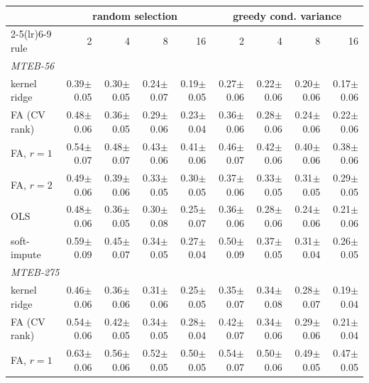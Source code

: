 \begin{tabular}{lrrrrrrrr}
\toprule
 & \multicolumn{4}{c}{random selection} & \multicolumn{4}{c}{greedy cond. variance} \\
\cmidrule(lr){2-5}\cmidrule(lr){6-9}
rule & 2 & 4 & 8 & 16 & 2 & 4 & 8 & 16 \\
\midrule
\multicolumn{9}{l}{\emph{MTEB-56}} \\
kernel ridge & 0.39{\tiny$\pm$0.05} & 0.30{\tiny$\pm$0.05} & 0.24{\tiny$\pm$0.07} & 0.19{\tiny$\pm$0.05} & 0.27{\tiny$\pm$0.06} & 0.22{\tiny$\pm$0.06} & 0.20{\tiny$\pm$0.06} & 0.17{\tiny$\pm$0.06} \\
FA (CV rank) & 0.48{\tiny$\pm$0.06} & 0.36{\tiny$\pm$0.05} & 0.29{\tiny$\pm$0.06} & 0.23{\tiny$\pm$0.04} & 0.36{\tiny$\pm$0.06} & 0.28{\tiny$\pm$0.06} & 0.24{\tiny$\pm$0.06} & 0.22{\tiny$\pm$0.06} \\
FA, $r=1$ & 0.54{\tiny$\pm$0.07} & 0.48{\tiny$\pm$0.07} & 0.43{\tiny$\pm$0.06} & 0.41{\tiny$\pm$0.06} & 0.46{\tiny$\pm$0.07} & 0.42{\tiny$\pm$0.06} & 0.40{\tiny$\pm$0.06} & 0.38{\tiny$\pm$0.06} \\
FA, $r=2$ & 0.49{\tiny$\pm$0.06} & 0.39{\tiny$\pm$0.06} & 0.33{\tiny$\pm$0.05} & 0.30{\tiny$\pm$0.05} & 0.37{\tiny$\pm$0.06} & 0.33{\tiny$\pm$0.05} & 0.31{\tiny$\pm$0.05} & 0.29{\tiny$\pm$0.05} \\
OLS & 0.48{\tiny$\pm$0.06} & 0.36{\tiny$\pm$0.05} & 0.30{\tiny$\pm$0.08} & 0.25{\tiny$\pm$0.07} & 0.36{\tiny$\pm$0.06} & 0.28{\tiny$\pm$0.06} & 0.24{\tiny$\pm$0.06} & 0.21{\tiny$\pm$0.06} \\
soft-impute & 0.59{\tiny$\pm$0.09} & 0.45{\tiny$\pm$0.07} & 0.34{\tiny$\pm$0.05} & 0.27{\tiny$\pm$0.04} & 0.50{\tiny$\pm$0.09} & 0.37{\tiny$\pm$0.05} & 0.31{\tiny$\pm$0.04} & 0.26{\tiny$\pm$0.05} \\
\midrule
\multicolumn{9}{l}{\emph{MTEB-275}} \\
kernel ridge & 0.46{\tiny$\pm$0.06} & 0.36{\tiny$\pm$0.06} & 0.31{\tiny$\pm$0.06} & 0.25{\tiny$\pm$0.05} & 0.35{\tiny$\pm$0.07} & 0.34{\tiny$\pm$0.08} & 0.28{\tiny$\pm$0.07} & 0.19{\tiny$\pm$0.04} \\
FA (CV rank) & 0.54{\tiny$\pm$0.06} & 0.42{\tiny$\pm$0.05} & 0.34{\tiny$\pm$0.05} & 0.28{\tiny$\pm$0.04} & 0.42{\tiny$\pm$0.07} & 0.34{\tiny$\pm$0.06} & 0.29{\tiny$\pm$0.06} & 0.21{\tiny$\pm$0.04} \\
FA, $r=1$ & 0.63{\tiny$\pm$0.06} & 0.56{\tiny$\pm$0.06} & 0.52{\tiny$\pm$0.05} & 0.50{\tiny$\pm$0.05} & 0.54{\tiny$\pm$0.07} & 0.50{\tiny$\pm$0.06} & 0.49{\tiny$\pm$0.05} & 0.47{\tiny$\pm$0.05} \\

\end{tabular}
